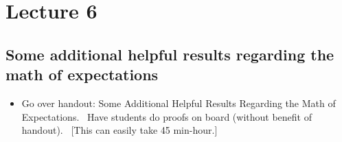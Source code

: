 \documentclass[11pt]{article}
\begin{document}
\section{Lecture 6}

\subsection{Some additional helpful results regarding the math of
expectations}

\begin{itemize}
\item Go over handout: Some Additional Helpful Results Regarding the Math of
Expectations. \ Have students do proofs on board (without benefit of
handout). \ [This can easily take 45 min-hour.]
\end{itemize}
\end{document}

